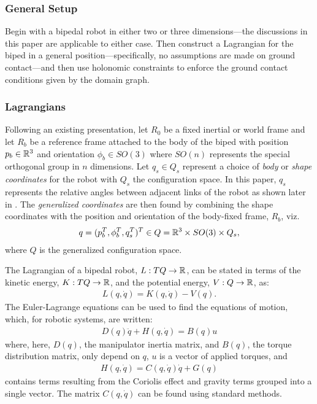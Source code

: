 

\subsubsection{General Setup}
Begin with a bipedal robot in either two or three dimensions---the discussions in this paper are applicable to either case. Then construct a Lagrangian for the biped in a general position---specifically, no assumptions are made on ground contact---and then use holonomic constraints to enforce the ground contact conditions given by the domain graph.

\subsubsection{Lagrangians}
Following an existing presentation,\cite{GCAS10}\xspace let $R_{0}$ be a fixed inertial or world frame and let $R_{b}$ be a reference frame attached to the body of the biped with position $p_{b} \in \mathbb{R}^{3}$ and orientation $\phi_{b} \in SO(3)$ where $SO(n)$ represents the special orthogonal group in $n$ dimensions.\cite{CCNPW86}\xspace Let $q_{s} \in Q_{s}$ represent a choice of {\em body} or {\em shape coordinates} for the robot with $Q_{s}$ the configuration space. In this paper, $q_{s}$ represents the relative angles between adjacent links of the robot as shown later in . The {\em generalized coordinates} are then found by combining the shape coordinates with the position and orientation of the body-fixed frame, $R_{b}$, viz.
\begin{align}
  q = (p_{b}^{T}, \phi_{b}^{T}, q_{s}^{T})^{T} \in Q = \mathbb{R}^{3} \times SO(3) \times Q_{s},
\end{align}
where $Q$ is the generalized configuration space.

The Lagrangian of a bipedal robot, $L : TQ \to \mathbb{R}$, can be stated in terms of the kinetic energy, $K : TQ \to \mathbb{R}$, and the potential energy, $V : Q \to \mathbb{R}$, as:
\begin{align}
  L(q, {\dot q}) = K(q, {\dot q}) - V(q).
\end{align}
The Euler-Lagrange equations can be used to find the equations of motion, which, for robotic systems,\cite{MLS94}\xspace are written:
\begin{align}
  \label{eqn:eom}
  D(q)\ddot{q} + H(q,\dot{q}) = B(q) u
\end{align}
where, here, $D(q)$, the manipulator inertia matrix, and $B(q)$, the torque distribution matrix, only depend on $q$, $u$ is a vector of applied torques, and
\begin{align}
  H(q,{\dot q}) = C(q,{\dot q}) {\dot q} + G(q)
\end{align}
contains terms resulting from the Coriolis effect and gravity terms grouped into a single vector. The matrix $C(q, {\dot q})$ can be found using standard methods.\cite{MLS94}

